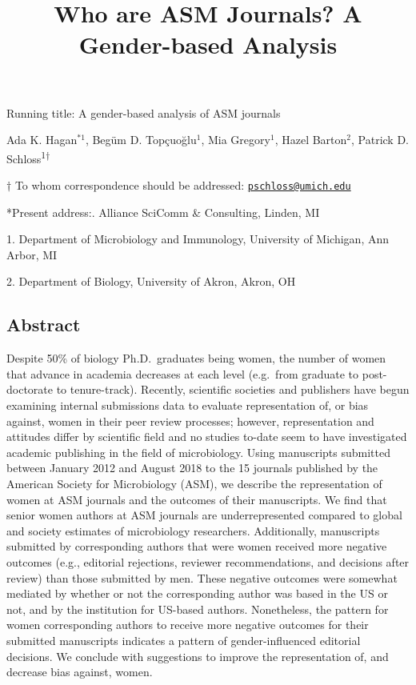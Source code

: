 \documentclass[11pt,]{article}
\title{\textbf{Who are ASM Journals? A Gender-based Analysis}}
\author{}
\date{}
\begin{document}
\maketitle

\vspace{35mm}

Running title: A gender-based analysis of ASM journals

\vspace{35mm}

Ada K. Hagan\(^{*1}\), Begüm D. Topçuoğlu\({^1}\), Mia Gregory\({^1}\),
Hazel Barton\({^2}\), Patrick D. Schloss\textsuperscript{1\(\dagger\)}

\vspace{40mm}

\(\dagger\) To whom correspondence should be addressed:
\href{mailto:pschloss@umich.edu}{\nolinkurl{pschloss@umich.edu}}

*Present address:. Alliance SciComm \& Consulting, Linden, MI

1. Department of Microbiology and Immunology, University of Michigan,
Ann Arbor, MI

2. Department of Biology, University of Akron, Akron, OH

\newpage

\linenumbers

\subsection{Abstract}\label{abstract}

Despite 50\% of biology Ph.D.~graduates being women, the number of women
that advance in academia decreases at each level (e.g.~from graduate to
post-doctorate to tenure-track). Recently, scientific societies and
publishers have begun examining internal submissions data to evaluate
representation of, or bias against, women in their peer review
processes; however, representation and attitudes differ by scientific
field and no studies to-date seem to have investigated academic
publishing in the field of microbiology. Using manuscripts submitted
between January 2012 and August 2018 to the 15 journals published by the
American Society for Microbiology (ASM), we describe the representation
of women at ASM journals and the outcomes of their manuscripts. We find
that senior women authors at ASM journals are underrepresented compared
to global and society estimates of microbiology researchers.
Additionally, manuscripts submitted by corresponding authors that were
women received more negative outcomes (e.g., editorial rejections,
reviewer recommendations, and decisions after review) than those
submitted by men. These negative outcomes were somewhat mediated by
whether or not the corresponding author was based in the US or not, and
by the institution for US-based authors. Nonetheless, the pattern for
women corresponding authors to receive more negative outcomes for their
submitted manuscripts indicates a pattern of gender-influenced editorial
decisions. We conclude with suggestions to improve the representation
of, and decrease bias against, women.
\end{document}
